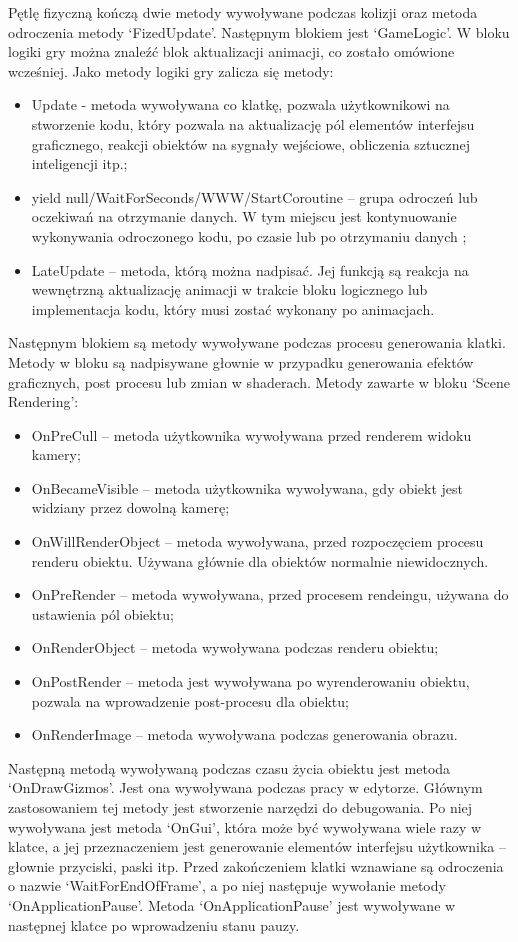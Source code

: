 \documentclass[12pt,twoside]{article}
\begin{document}
Pętlę fizyczną kończą dwie metody wywoływane podczas kolizji oraz metoda
odroczenia metody ‘FizedUpdate’. Następnym blokiem jest ‘GameLogic’. W bloku
logiki gry można znaleźć blok aktualizacji animacji, co zostało omówione
wcześniej. Jako metody logiki gry zalicza się metody:
\begin{itemize}
\item Update - metoda wywoływana co klatkę, pozwala użytkownikowi na stworzenie
kodu, który pozwala na aktualizację pól elementów interfejsu graficznego,
reakcji obiektów na sygnały wejściowe, obliczenia sztucznej inteligencji itp.; 
\item yield null/WaitForSeconds/WWW/StartCoroutine – grupa odroczeń lub
oczekiwań na otrzymanie danych. W tym miejscu jest kontynuowanie wykonywania
odroczonego kodu, po czasie lub po otrzymaniu danych \cite{Unity:yield};
\item LateUpdate – metoda, którą można nadpisać. Jej funkcją są reakcja na
wewnętrzną aktualizację animacji w trakcie bloku logicznego lub implementacja
kodu, który musi zostać wykonany po animacjach. 
\end{itemize}
Następnym blokiem są metody wywoływane podczas procesu generowania klatki.
Metody w bloku są nadpisywane głownie w przypadku generowania efektów
graficznych, post procesu lub zmian w shaderach. Metody zawarte w bloku ‘Scene
Rendering’:
\begin{itemize}
\item OnPreCull – metoda użytkownika wywoływana przed renderem widoku kamery\cite{Unity:onCurl};  
\item OnBecameVisible – metoda użytkownika wywoływana, gdy obiekt jest widziany
przez dowolną kamerę;
\item OnWillRenderObject – metoda wywoływana, przed rozpoczęciem procesu renderu
obiektu. Używana głównie dla obiektów normalnie niewidocznych.
\item OnPreRender – metoda wywoływana, przed procesem rendeingu, używana do
ustawienia pól obiektu\cite{Unity:OnPreRender};
\item OnRenderObject – metoda wywoływana podczas renderu obiektu;
\item OnPostRender – metoda jest wywoływana po wyrenderowaniu obiektu, pozwala
na wprowadzenie post-procesu dla obiektu\cite{Unity:OnPostRender};
\item OnRenderImage – metoda wywoływana podczas generowania obrazu.
\end{itemize}
Następną metodą wywoływaną podczas czasu życia obiektu jest metoda
‘OnDrawGizmos’. Jest ona wywoływana podczas pracy w edytorze. Głównym
zastosowaniem tej metody jest stworzenie narzędzi do debugowania. Po niej
wywoływana jest metoda ‘OnGui’, która może być wywoływana wiele razy w klatce, a
jej przeznaczeniem jest generowanie elementów interfejsu użytkownika – głownie
przyciski, paski itp. Przed zakończeniem klatki wznawiane są odroczenia o nazwie
‘WaitForEndOfFrame’, a po niej następuje wywołanie metody ‘OnApplicationPause’.
Metoda ‘OnApplicationPause’ jest wywoływane w następnej klatce po wprowadzeniu
stanu pauzy.
\end{document}
